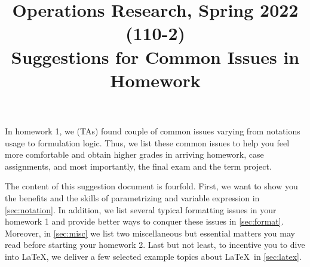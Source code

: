 \documentclass{OR_SolutionTheme}
\title{Operations Research, Spring 2022 (110-2) \\
Suggestions for Common Issues in Homework}
\begin{document}
\maketitle

In homework 1, we (TAs) found couple of common issues varying from notations usage
to formulation logic. Thus, we list these common issues to help you 
feel more comfortable and obtain higher grades 
in arriving homework, case assignments, and most importantly, the final exam and the term project.

The content of this suggestion document is fourfold.
First, we want to show you the benefits and 
the skills of parametrizing and variable expression
in \cref{sec:notation}.
In addition, we list several typical formatting issues 
in your homework 1 and provide better ways 
to conquer these issues in \cref{sec:format}.
Moreover, in \cref{sec:misc} we list two
miscellaneous but essential matters you may read 
before starting your homework 2. 
Last but not least, to incentive you to dive into \LaTeX, 
we deliver a few selected example topics about \LaTeX \
in \cref{sec:latex}.
\end{document}
